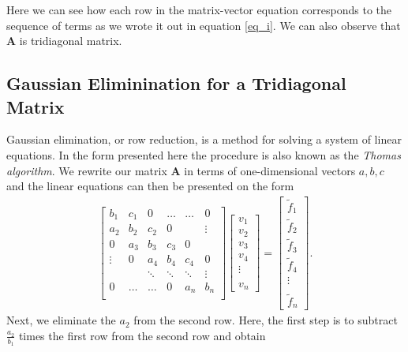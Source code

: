 \documentclass[a4paper]{article}
\begin{document}
Here we can see how each row in the matrix-vector equation corresponds to the sequence of terms as we wrote it out in equation \eqref{eq_i}. We can also observe that $\mathbf{A}$ is tridiagonal matrix. 

\subsection{Gaussian Eliminination for a Tridiagonal Matrix}
Gaussian elimination, or row reduction, is a method for solving a system of linear equations. In the form presented here the procedure is also known as the \textit{Thomas algorithm}. We rewrite our matrix $\mathbf{A}$ in terms of one-dimensional vectors $a,b,c$ and the linear equations can then be presented on the form
\begin{align}
  \begin{bmatrix}
    b_1 & c_1 & 0  & \hdots & \hdots &   0    \\
    a_2 & b_2 & c_2 & 0      & &\vdots \\
    0 & a_3 & b_3  & c_3     & 0 &  \\
    \vdots & 0 & a_4  & b_4     & c_4 & 0 \\
    & & \ddots & \ddots & \ddots & \vdots\\
    0 & \hdots  &\hdots & 0 &a_n & b_n \\
  \end{bmatrix}
  \begin{bmatrix}
    v_1 \\ v_2 \\ v_3 \\ v_4 \\ \vdots \\ \\ v_n
  \end{bmatrix}
  =
  \begin{bmatrix}
    \tilde{f}_1 \\ \tilde{f}_2 \\ \tilde{f}_3 \\ \tilde{f}_4 \\ \vdots \\ \\ \tilde{f}_n
  \end{bmatrix}.
  \label{eqg1}
\end{align}
Next, we eliminate the $a_2$ from the second row. Here, the first step is to subtract $\frac{a_2}{b_1}$ times the first row from the second row and obtain
\end{document}
